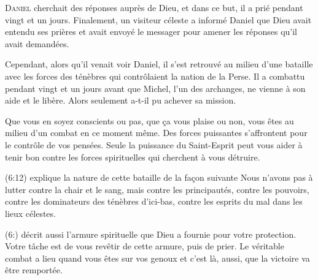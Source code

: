 

\lettrine{D}{aniel} cherchait des réponses auprès de Dieu,
 et dans ce but, il a prié pendant vingt et un jours.
 Finalement, un visiteur céleste a informé Daniel que Dieu avait entendu
 ses prières et avait envoyé le messager pour amener les réponses
 qu'il avait demandées. 

Cependant, alors qu'il venait voir Daniel, il s'est retrouvé au milieu
 d'une bataille avec les forces des ténèbres qui contrôlaient
 la nation de la Perse. Il a combattu pendant vingt et un jours
 avant que Michel, l'un des archanges, ne vienne à son aide et le libère.
 Alors seulement a-t-il pu achever sa mission. 


Que vous en soyez conscients ou pas, que \c{c}a vous plaise ou non,
 vous êtes au milieu d'un combat en ce moment même.
 Des forces puissantes s'affrontent pour le contrôle de vos pensées.
 Seule la puissance du Saint-Esprit peut vous aider à tenir bon contre
 les forces spirituelles qui cherchent à vous détruire. 

(6:12) explique la nature de cette bataille
 de la fa\c{c}on suivante\frcolon{} \Og Nous n'avons pas à lutter contre la chair
 et le sang, mais contre les principautés, contre les pouvoirs,
 contre les dominateurs des ténèbres d'ici-bas,
 contre les esprits du mal dans les lieux célestes. \Fg{}

(6:) décrit aussi l'armure spirituelle que Dieu
 a fournie pour votre protection. Votre tâche est de vous revêtir
 de cette armure, puis de prier. Le véritable combat a lieu
 quand vous êtes sur vos genoux et c'est là, aussi,
 que la victoire va être remportée. 

\dvrule




